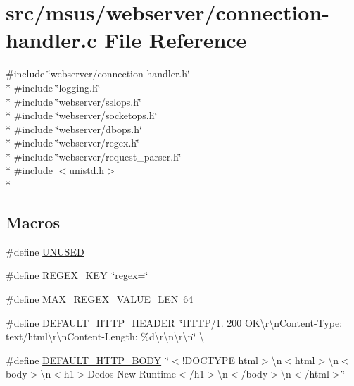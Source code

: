 \hypertarget{connection-handler_8c}{\section{src/msus/webserver/connection-\/handler.c File Reference}
\label{connection-handler_8c}
}
{\ttfamily \#include \char`\"{}webserver/connection-\/handler.\-h\char`\"{}}\\*
{\ttfamily \#include \char`\"{}logging.\-h\char`\"{}}\\*
{\ttfamily \#include \char`\"{}webserver/sslops.\-h\char`\"{}}\\*
{\ttfamily \#include \char`\"{}webserver/socketops.\-h\char`\"{}}\\*
{\ttfamily \#include \char`\"{}webserver/dbops.\-h\char`\"{}}\\*
{\ttfamily \#include \char`\"{}webserver/regex.\-h\char`\"{}}\\*
{\ttfamily \#include \char`\"{}webserver/request\-\_\-parser.\-h\char`\"{}}\\*
{\ttfamily \#include $<$unistd.\-h$>$}\\*
\subsection*{Macros}
\begin{DoxyCompactItemize}
\item 
\#define \hyperlink{connection-handler_8c_addf5ec070e9499d36b7f2009ce736076}{U\-N\-U\-S\-E\-D}
\item 
\#define \hyperlink{connection-handler_8c_afcd8c081c0b7326ca8ac997adec10a4b}{R\-E\-G\-E\-X\-\_\-\-K\-E\-Y}~\char`\"{}regex=\char`\"{}
\item 
\#define \hyperlink{connection-handler_8c_a72d23e8f74e409a7e5fb8a3875888a4c}{M\-A\-X\-\_\-\-R\-E\-G\-E\-X\-\_\-\-V\-A\-L\-U\-E\-\_\-\-L\-E\-N}~64
\item 
\#define \hyperlink{connection-handler_8c_a70992e4154471284e27ecd7566edbcb1}{D\-E\-F\-A\-U\-L\-T\-\_\-\-H\-T\-T\-P\-\_\-\-H\-E\-A\-D\-E\-R}~\char`\"{}H\-T\-T\-P/1. 200 O\-K\textbackslash{}r\textbackslash{}n\-Content-\/Type\-: text/html\textbackslash{}r\textbackslash{}n\-Content-\/Length\-: \%d\textbackslash{}r\textbackslash{}n\textbackslash{}r\textbackslash{}n\char`\"{} \textbackslash{}
\item 
\#define \hyperlink{connection-handler_8c_a2870bb55c6ebf7807375ec589e6a1919}{D\-E\-F\-A\-U\-L\-T\-\_\-\-H\-T\-T\-P\-\_\-\-B\-O\-D\-Y}~\char`\"{}$<$!D\-O\-C\-T\-Y\-P\-E html$>$\textbackslash{}n$<$html$>$\textbackslash{}n$<$body$>$\textbackslash{}n$<$h1$>$Dedos New Runtime$<$/h1$>$\textbackslash{}n$<$/body$>$\textbackslash{}n$<$/html$>$\char`\"{}
\end{DoxyCompactItemize}
